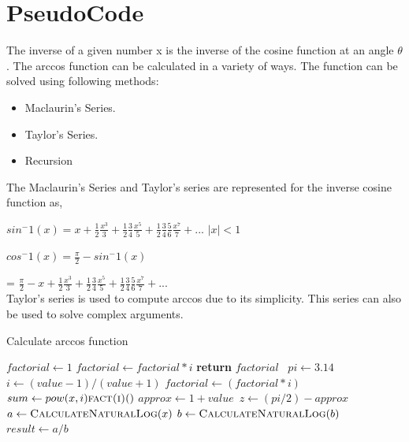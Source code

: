 \documentclass{article}
\begin{document}
    \section{PseudoCode}
    \noindent The inverse of a given number x is the inverse of the cosine function at an angle $\theta$. The arccos function can be calculated in a variety of ways. The function can be solved using following methods:
    \begin{itemize}
        \item Maclaurin's Series.
        \item Taylor's Series.
        \item Recursion
    \end{itemize}
    The Maclaurin's Series and Taylor's series are represented for the inverse cosine function as,
    \par
    $sin^-1(x) = x+\frac{1}{2} \frac{x^3}{3}+ \frac{1}{2} \frac{3}{4} \frac{x^5}{5}+\frac{1}{2}\frac{3}{4} \frac{5}{6} \frac{x^7}{7}+...$ $|x|<1$
    \par
    $cos^-1(x) = \frac{\pi}{2}- sin^-1(x)$
    \par
    = $\frac{\pi}{2}-  x+\frac{1}{2} \frac{x^3}{3}+ \frac{1}{2} \frac{3}{4} \frac{x^5}{5}+\frac{1}{2}\frac{3}{4} \frac{5}{6} \frac{x^7}{7}+...$\\[0.2 cm]
    Taylor's series is used to compute arccos due to its simplicity. This series can also be used to solve complex arguments.
    \begin{algorithm}
        \footnotesize
        \caption{Calculate arccos function}
        \begin{algorithmic}[1]
                \State $factorial \leftarrow 1$
                    \State $factorial \leftarrow factorial * i$
                \EndFor
                \State \textbf{return} $factorial$\
            \EndProcedure
            \Statex
                \State $pi \leftarrow 3.14$
                \State $i \leftarrow (value-1) / (value+1)$
                    \State $factorial \leftarrow (factorial * i)$
                    \State $sum \leftarrow pow(x,i) \Call{fact(i)} $
                \EndFor
                \State $approx\leftarrow 1+value$\
                \State $z\leftarrow (pi/2)-approx$
            \EndProcedure
            \Statex
            \State $ a \leftarrow \Call{CalculateNaturalLog}{x}$
            \State $ b \leftarrow \Call{CalculateNaturalLog}{b}$
            \State $result \leftarrow a/b $\Comment{Final result of $log_b x$}
        \end{algorithmic}
    \end{algorithm}
    \\[0.2 cm]
\end{document}
